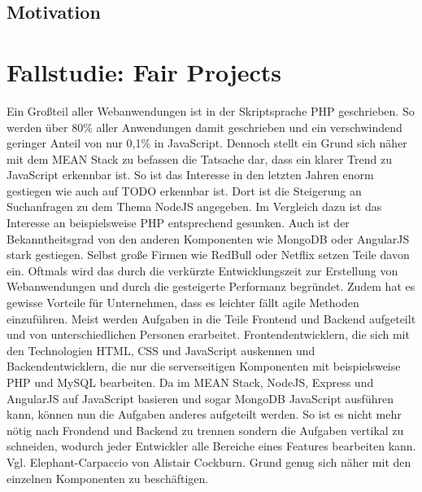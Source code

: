 \subsection{Motivation}\label{motivation-markus}

\section{Fallstudie: Fair Projects}\label{fallstudie-fair-projects}

Ein Großteil aller Webanwendungen ist in der Skriptsprache PHP geschrieben. 
So werden über 80\% aller Anwendungen damit geschrieben und ein verschwindend geringer Anteil von nur 0,1\% in JavaScript.
Dennoch stellt ein Grund sich näher mit dem MEAN Stack zu befassen die Tatsache dar, dass ein klarer Trend zu JavaScript erkennbar ist.
So ist das Interesse in den letzten Jahren enorm gestiegen wie auch auf TODO erkennbar ist.
Dort ist die Steigerung an Suchanfragen zu dem Thema NodeJS angegeben.
Im Vergleich dazu ist das Interesse an beispielsweise PHP entsprechend gesunken. 
Auch ist der Bekanntheitsgrad von den anderen Komponenten wie MongoDB oder AngularJS stark gestiegen.
Selbst große Firmen wie RedBull oder Netflix setzen Teile davon ein.
Oftmals wird das durch die verkürzte Entwicklungszeit zur Erstellung von Webanwendungen und durch die gesteigerte Performanz begründet.
Zudem hat es gewisse Vorteile für Unternehmen, dass es leichter fällt agile Methoden einzuführen.
Meist werden Aufgaben in die Teile Frontend und Backend aufgeteilt und von unterschiedlichen Personen erarbeitet.
Frontendentwicklern, die sich mit den Technologien HTML, CSS und JavaScript auskennen und Backendentwicklern, die nur die serverseitigen Komponenten mit beispielsweise PHP und MySQL bearbeiten.
Da im MEAN Stack, NodeJS, Express und AngularJS auf JavaScript basieren und sogar MongoDB JavaScript ausführen kann, können nun die Aufgaben anderes aufgeteilt werden.
So ist es nicht mehr nötig nach Frondend und Backend zu trennen sondern die Aufgaben vertikal zu schneiden, wodurch jeder Entwickler alle Bereiche eines Features bearbeiten kann.
Vgl. Elephant-Carpaccio von Alistair Cockburn. 
Grund genug sich näher mit den einzelnen Komponenten zu beschäftigen.
